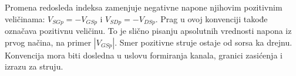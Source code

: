 Promena redosleda indeksa zamenjuje negativne napone njihovim pozitivnim veličinama: $V_{SGp}=-V_{GSp}$ i $V_{SDp}=-V_{DSp}$. Prag u ovoj konvenciji takođe označava pozitivnu veličinu. To je slično pisanju apsolutnih vrednosti napona iz prvog načina, na primer $|V_{GSp}|$. Smer pozitivne struje ostaje od sorsa ka drejnu. Konvencija mora biti dosledna u uslovu formiranja kanala, granici zasićenja i izrazu za struju.
